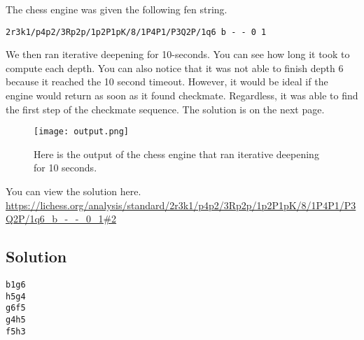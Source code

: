 \documentclass[sigconf]{acmart}
\begin{document}
The chess engine was given the following fen string.
\begin{verbatim}
2r3k1/p4p2/3Rp2p/1p2P1pK/8/1P4P1/P3Q2P/1q6 b - - 0 1
\end{verbatim}
We then ran iterative deepening for 10-seconds.
You can see how long it took to compute each depth.
You can also notice that it was not able to finish depth 6 because it reached the 10 second timeout.
However, it would be ideal if the engine would return as soon as it found checkmate.
Regardless, it was able to find the first step of the checkmate sequence.
The solution is on the next page.

\begin{figure}[H]
    \centering
    \texttt{[image: output.png]}
    \caption{Here is the output of the chess engine that ran iterative deepening for 10 seconds.}
    \label{fig:enter-label}
\end{figure}
You can view the solution here.
\url{https://lichess.org/analysis/standard/2r3k1/p4p2/3Rp2p/1p2P1pK/8/1P4P1/P3Q2P/1q6_b_-_-_0_1#2}

\subsection{Solution}
\begin{verbatim}
b1g6
h5g4
g6f5
g4h5
f5h3
\end{verbatim}
\end{document}
